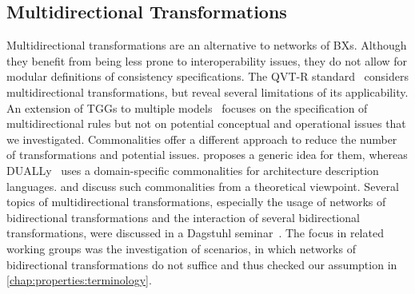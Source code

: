 \subsection*{Multidirectional Transformations}
Multidirectional transformations 
are an alternative to networks of \acp{BX}.
Although they benefit from being less prone to interoperability issues, they do not allow for modular definitions of consistency specifications.
The QVT-R standard~\cite{qvt} considers multidirectional transformations, but \textcite{macedo2014a} reveal several limitations of its applicability.
An extension of \acp{TGG} to multiple models~\cite{trollmann2015a, trollmann2016a} focuses on the specification of multidirectional rules but not on potential conceptual and operational issues that we investigated.
Commonalities \metamodels offer a different approach to reduce the number of transformations and potential issues.
\textcite{gleitze2017a} proposes a generic idea for them, whereas DUALLy~\cite{malavolta2010a, eramo2012a} uses a domain-specific commonalities \metamodel for architecture description languages.
\textcite{stunkel2018a} and \textcite{diskin2018a} discuss such commonalities \metamodels from a theoretical viewpoint.
Several topics of multidirectional transformations, especially the usage of networks of bidirectional transformations and the interaction of several bidirectional transformations, were discussed in a Dagstuhl seminar~\cite{cleve2019dagstuhl}.
The focus in related working groups was the investigation of scenarios, in which networks of bidirectional transformations do not suffice and thus checked our assumption in \autoref{chap:properties:terminology}.


